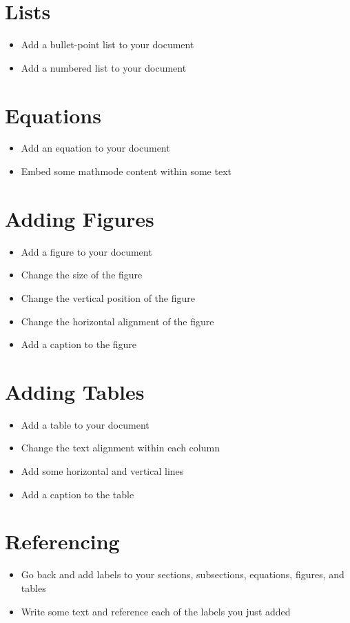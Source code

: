 \documentclass[11pt,a4paper]{article}
\begin{document}
\section{Lists}
\begin{itemize}
\item Add a bullet-point list to your document
\item Add a numbered list to your document
\end{itemize}

\section{Equations}
\begin{itemize}
\item Add an equation to your document
\item Embed some mathmode content within some text
\end{itemize}

\section{Adding Figures}
\begin{itemize}
\item Add a figure to your document
\item Change the size of the figure
\item Change the vertical position of the figure
\item Change the horizontal alignment of the figure
\item Add a caption to the figure
\end{itemize}

\section{Adding Tables}
\begin{itemize}
\item Add a table to your document
\item Change the text alignment within each column
\item Add some horizontal and vertical lines
\item Add a caption to the table
\end{itemize}

\section{Referencing}
\begin{itemize}
\item Go back and add labels to your sections, subsections, equations, figures, and tables
\item Write some text and reference each of the labels you just added
\end{itemize}
\end{document}
